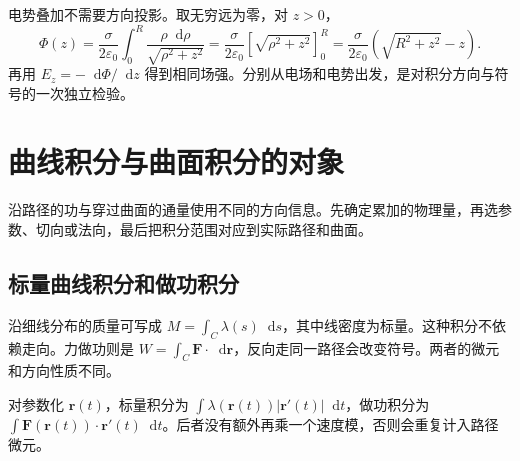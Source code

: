 \documentclass[11pt,openany,fontset=fandol]{ctexbook}
\theoremstyle{plain}\newtheorem{theorem}{定理}[chapter]\newtheorem{proposition}[theorem]{命题}
\theoremstyle{definition}\newtheorem{definition}{定义}[chapter]\newtheorem{example}{例}[chapter]
\theoremstyle{remark}\newtheorem*{remark}{说明}
\newcommand{\dd}{\mathop{}\!\mathrm d}\newcommand{\ii}{\mathrm i}\newcommand{\ee}{\mathrm e}
\newcommand{\vct}[1]{\bm{#1}}\newcommand{\Rea}{\operatorname{Re}}\newcommand{\Ima}{\operatorname{Im}}
\begin{document}
电势叠加不需要方向投影。取无穷远为零，对 $z>0$，
\begin{equation}
\Phi(z)=\frac{\sigma}{2\varepsilon_0}\int_0^R\frac{\rho\dd\rho}{\sqrt{\rho^2+z^2}}
=\frac{\sigma}{2\varepsilon_0}[\sqrt{\rho^2+z^2}]_0^R
=\frac{\sigma}{2\varepsilon_0}(\sqrt{R^2+z^2}-z).
\end{equation}
再用 $E_z=-\dd\Phi/\dd z$ 得到相同场强。分别从电场和电势出发，是对积分方向与符号的一次独立检验。

\section{曲线积分与曲面积分的对象}
沿路径的功与穿过曲面的通量使用不同的方向信息。先确定累加的物理量，再选参数、切向或法向，最后把积分范围对应到实际路径和曲面。

\subsection{标量曲线积分和做功积分}
沿细线分布的质量可写成 $M=\int_C\lambda(s)\dd s$，其中线密度为标量。这种积分不依赖走向。力做功则是 $W=\int_C\vct F\cdot\dd\vct r$，反向走同一路径会改变符号。两者的微元和方向性质不同。

对参数化 $\vct r(t)$，标量积分为 $\int\lambda(\vct r(t))|\vct r'(t)|\dd t$，做功积分为 $\int\vct F(\vct r(t))\cdot\vct r'(t)\dd t$。后者没有额外再乘一个速度模，否则会重复计入路径微元。
\end{document}

